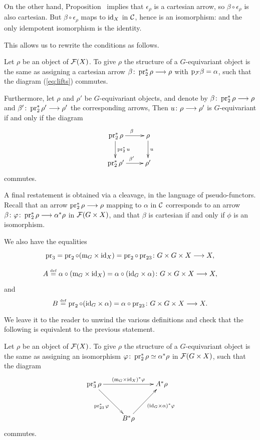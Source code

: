 \begin{3   FIBERED CATEGORIES}
\begin{3.8 Equivariant objects in fibcats}
On the other hand, Proposition~ implies that $\epsilon_{\rho}$ is a cartesian arrow, so $\beta \circ \epsilon_{\rho}$ is also cartesian. But $\beta \circ \epsilon_{\rho}$ maps to $\mathrm{id}_{X}$ in $\mathcal{C}$, hence is an isomorphism: and the only idempotent isomorphism is the identity.

This allows us to rewrite the conditions as follows.

\begin{proposition}
Let $\rho$ be an object of $\mathcal{F}(X)$. To give $\rho$ the structure of a  $G$-equivariant object is the same as assigning a cartesian arrow $\beta \colon  \pr_{2}^{*}\rho \arr \rho$ with $\mathrm{p}_{\mathcal{F}}\beta = \alpha$, such that the diagram (\ref{eq:lifts}) commutes.

Furthermore, let $\rho$ and $\rho'$ be $G$-equivariant objects, and denote by $\beta \colon \pr_{2}^{*}\rho \arr \rho$ and $\beta' \colon \pr_{2}^{*}\rho' \arr \rho'$ the corresponding arrows, Then $u \colon \rho \arr \rho'$ is $G$-equivariant if and only if the diagram
   \[
   \xymatrix{
   {}\pr_{2}^{*}\rho \ar[r]^{\beta} \ar[d]^{\pr_{2}^{*}u}&
   \rho              \ar[d]^{u}  \\
   {}\pr_{2}^{*}\rho' \ar[r]^{\beta'}&
   \rho'
   }
   \]
commutes.

\end{proposition}

A final restatement is obtained via a cleavage, in the language of pseudo-functors. Recall that an arrow $\pr_{2}^{*}\rho \arr \rho$ mapping to $\alpha$ in $\mathcal{C}$ corresponds to an arrow $\beta\colon \phi \colon \pr_{2}^{*}\rho \arr \alpha^{*} \rho$ in $\mathcal{F}(G \times X)$, and that $\beta$ is cartesian if and only if $\phi$ is an isomorphism.

We also have the equalities
   \[
   \xymatrix{
   \pr_{3} =
   \pr_{2} \circ (\mul_{G} \times \id_{X}) =  \pr_{2} \circ \pr_{23}
   \colon G \times G \times X \arr X,
   }
   \]
   \[
   \xymatrix{
   A \eqdef
   \alpha \circ (\mul_{G} \times \id_{X})
    = \alpha \circ (\id_{G} \times \alpha)
   \colon G \times G \times X \arr X,
   }
   \]
and
   \[
   B \eqdef 
   \pr_{2} \circ (\id_{G} \times \alpha)
    = \alpha \circ \pr_{23}
   \colon G \times G \times X \arr X.
   \]


 We leave it to the reader to unwind the various definitions and check that the following is equivalent to the previous statement.

\begin{proposition}\label{prop:definition-equivariant}
Let $\rho$ be an object of $\mathcal{F}(X)$. To give $\rho$ the structure of a  $G$-equivariant object is the same as assigning an isomorphism $\varphi \colon \operatorname{pr}_{2}^{*}\rho \simeq \alpha^{*}\rho$ in $\mathcal{F}(G \times X)$, such that the diagram
   \[
   \xymatrix@R+10pt{
   {}\pr_{3}^{*}\rho
      \ar[rr]^-{(\mul_{G} \times \id_{X})^{*}\phi}
      \ar[rd]_{\pr_{23}^{*}\phi}
   && A^{*}\rho\\
   & B^{*}\rho\ar[ru]_{(\id_{G}\times \alpha)^{*} \phi}
   }
   \]
commutes.


\end{proposition}
\end{3.8 Equivariant objects in fibcats}
\end{3   FIBERED CATEGORIES}
